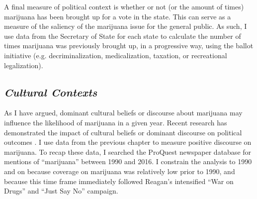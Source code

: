 A final measure of political context is whether or not (or the amount of times) marijuana has been brought up for a vote in the state. This can serve as a measure of the saliency of the marijuana issue for the general public. As such, I use data from the Secretary of State for each state to calculate the number of times marijuana was previously brought up, in a progressive way, using the ballot initiative (e.g. decriminalization, medicalization, taxation, or recreational legalization). 



\subsection{\it{Cultural Contexts}}

As I have argued, dominant cultural beliefs or discourse about marijuana may influence the likelihood of marijuana in a given year.  Recent research has demonstrated the impact of cultural beliefs or dominant discourse on political outcomes \citep{bail_2012,mccammon_et_al_2007,ghaziani_and_baldassarri_2011}. I use data from the previous chapter to measure positive discourse on marijuana. To recap these data, I searched the ProQuest newspaper database for mentions of ``marijuana'' between 1990 and 2016. I constrain the analysis to 1990 and on because coverage on marijuana was relatively low prior to 1990, and because this time frame immediately followed Reagan's intensified ``War on Drugs'' and ``Just Say No'' campaign. 

